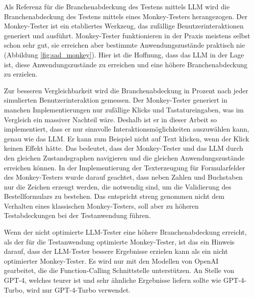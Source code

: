 Als Referenz für die Branchenabdeckung des Testens mittels LLM wird die Branchenabdeckung des Testens mittels eines Monkey-Testers herangezogen.
Der Monkey-Tester ist ein etabliertes Werkzeug, das zufällige Benutzerinteraktionen generiert und ausführt.
Monkey-Tester funktionieren in der Praxis meistens selbst schon sehr gut, sie erreichen aber bestimmte Anwendungszustände praktisch nie (Abbildung \ref{fig:sad_monkey}).
Hier ist die Hoffnung, dass das LLM in der Lage ist, diese Anwendungszustände zu erreichen und eine höhere Branchenabdeckung zu erzielen.

Zur besseren Vergleichbarkeit wird die Branchenabdeckung in Prozent nach jeder simulierten Benutzerinteraktion gemessen.
Der Monkey-Tester generiert in manchen Implementierungen nur zufällige Klicks und Tastatureingaben, was im Vergleich ein massiver Nachteil wäre.
Deshalb ist er in dieser Arbeit so implementiert, dass er nur \glqq{}sinnvolle\grqq{} Interaktionsmöglichkeiten auszuwählen kann, genau wie das LLM.
Er kann zum Beispiel nicht auf Text klicken, wenn der Klick keinen Effekt hätte.
Das bedeutet, dass der Monkey-Tester und das LLM durch den gleichen Zustandsgraphen navigieren und die gleichen Anwendungszustände erreichen können.
In der Implementierung der Texterzeugung für Formularfelder des Monkey-Testers wurde darauf geachtet, dass neben Zahlen und Buchstaben nur die Zeichen erzeugt werden, die notwendig sind, um die Validierung des Bestellformulars zu bestehen.
Das entspricht streng genommen nicht dem Verhalten eines klassischen Monkey-Testers, soll aber zu höheren Testabdeckungen bei der Testanwendung führen.

Wenn der nicht optimierte LLM-Tester eine höhere Branchenabdeckung erreicht, als der für die Testanwendung optimierte Monkey-Tester, ist das ein Hinweis darauf, dass der LLM-Tester bessere Ergebnisse erzielen kann als ein nicht optimierter Monkey-Tester.
Es wird nur mit den Modellen von OpenAI gearbeitet, die die Function-Calling Schnittstelle unterstützen.
An Stelle von GPT-4, welches teurer ist und sehr ähnliche Ergebnisse liefern sollte wie GPT-4-Turbo, wird nur GPT-4-Turbo verwendet.

